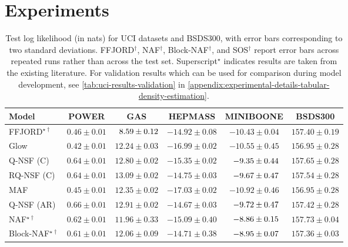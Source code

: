 \section{Experiments}
\begin{table}[t!]
	\caption{Test log likelihood (in nats) for UCI datasets and BSDS300, with error bars corresponding to two standard deviations. FFJORD$^\dagger$, NAF$^\dagger$, Block-NAF$^\dagger$, and SOS$^\dagger$ report error bars across repeated runs rather than across the test set. Superscript$^\star$ indicates results are taken from the existing literature. For validation results which can be used for comparison during model development, see \cref{tab:uci-results-validation} in \cref{appendix:experimental-details-tabular-density-estimation}.
	}
	\label{tab:uci-results}
        \vspace*{-0.1in}
	\begin{center}
		\begin{small}
			\begin{sc}
				\begin{tabular}{lccccc}
					\toprule
					Model & POWER & GAS & HEPMASS & MINIBOONE & BSDS300 \\ 
					\midrule
					FFJORD$^{\star\dagger}$ & $ 0.46 \pm 0.01$ & $ \hphantom{0}8.59 \pm 0.12$ & $ -14.92 \pm 0.08$ & $ -10.43 \pm 0.04$ & $ 157.40 \pm 0.19$ \\
					Glow & $ 0.42 \pm 0.01 $ & $ 12.24 \pm 0.03 $ & $ -16.99 \pm 0.02 $ & $ -10.55 \pm 0.45 $ & $ 156.95 \pm 0.28 $ \\
					Q-NSF (C) & $ 0.64 \pm 0.01 $ & $ 12.80 \pm 0.02 $ & $ -15.35 \pm 0.02 $ & $ \hphantom{0}{-9.35} \pm 0.44 $ & $ 157.65 \pm 0.28 $ \\
					RQ-NSF (C) & $ 0.64 \pm 0.01 $ & $ 13.09 \pm 0.02 $ & $ -14.75 \pm 0.03 $ & $ \hphantom{0}{-9.67} \pm 0.47 $ & $ 157.54 \pm 0.28 $  \\
					\midrule
					MAF & $ 0.45 \pm 0.01 $ & $ 12.35 \pm 0.02 $ & $ -17.03 \pm 0.02 $ & $ -10.92 \pm 0.46 $ & $ 156.95 \pm 0.28 $ \\
					Q-NSF (AR) & $ 0.66 \pm 0.01 $ & $ 12.91 \pm 0.02 $ & $ -14.67 \pm 0.03 $ & $ \hphantom{0}{-9.72} \pm 0.47 $ & $ 157.42 \pm 0.28 $  \\
					NAF$^{\star\dagger}$ & $0.62 \pm 0.01$ & $11.96 \pm 0.33$ & $-15.09 \pm 0.40$ & $\hphantom{0}{-8.86} \pm 0.15$ & $157.73 \pm 0.04$ \\
					Block-NAF$^{\star\dagger}$ & $0.61 \pm 0.01$ & $12.06 \pm 0.09$ & $-14.71 \pm 0.38$ & $\hphantom{0}{-8.95} \pm 0.07$ & $157.36 \pm 0.03$ \\

\end{tabular}
\end{sc}
\end{small}
\end{center}
\end{table}
